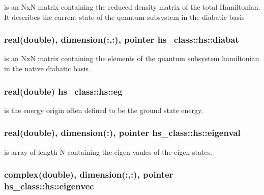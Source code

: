 is an Nx\+N matrix containing the reduced density matrix of the total Hamiltonian. It describes the current state of the quantum subsystem in the diabatic basis 

\hypertarget{strucths__class_1_1hs_a18f6eb65a6edae047d41c8aa5a3d9d09}{
\subsubsection[{diabat}]{\setlength{\rightskip}{0pt plus 5cm}real(double), dimension(\+:,\+:), pointer hs\+\_\+class\+::hs\+::diabat\hspace{0.3cm}{\ttfamily [private]}}}\label{strucths__class_1_1hs_a18f6eb65a6edae047d41c8aa5a3d9d09}


is an Nx\+N matrix containing the elements of the quantum subsystem hamiltonian in the native diabatic basis. 

\hypertarget{strucths__class_1_1hs_aa0f4d851a33f1d195d2b6b9334cdb5d5}{
\subsubsection[{eg}]{\setlength{\rightskip}{0pt plus 5cm}real(double) hs\+\_\+class\+::hs\+::eg\hspace{0.3cm}{\ttfamily [private]}}}\label{strucths__class_1_1hs_aa0f4d851a33f1d195d2b6b9334cdb5d5}


is the energy origin often defined to be the ground state energy. 

\hypertarget{strucths__class_1_1hs_ae978013c998c123a7430209fa2797511}{
\subsubsection[{eigenval}]{\setlength{\rightskip}{0pt plus 5cm}real(double), dimension(\+:), pointer hs\+\_\+class\+::hs\+::eigenval\hspace{0.3cm}{\ttfamily [private]}}}\label{strucths__class_1_1hs_ae978013c998c123a7430209fa2797511}


is array of length N containing the eigen vaules of the eigen states. 

\hypertarget{strucths__class_1_1hs_aac60f7bc14df6c4a5a1363c70b69b2db}{
\subsubsection[{eigenvec}]{\setlength{\rightskip}{0pt plus 5cm}complex(double), dimension(\+:,\+:), pointer hs\+\_\+class\+::hs\+::eigenvec\hspace{0.3cm}{\ttfamily [private]}}}\label{strucths__class_1_1hs_aac60f7bc14df6c4a5a1363c70b69b2db}


